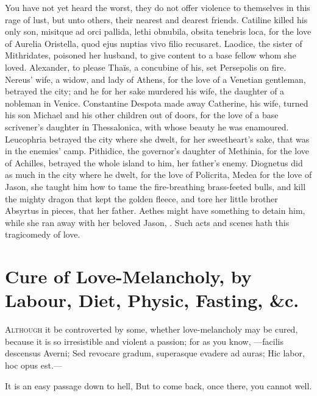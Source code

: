 You have not yet heard the worst, they do not offer violence to
themselves in this rage of lust, but unto others, their nearest and
dearest friends. Catiline killed his only son, misitque ad orci
pallida, lethi obnubila, obsita tenebris loca, for the love of Aurelia
Oristella, quod ejus nuptias vivo filio recusaret. Laodice, the
sister of Mithridates, poisoned her husband, to give content to a base
fellow whom she loved. Alexander, to please Thaïs, a concubine of
his, set Persepolis on fire. Nereus' wife, a widow, and lady of
Athens, for the love of a Venetian gentleman, betrayed the city; and he
for her sake murdered his wife, the daughter of a nobleman in Venice.
Constantine Despota made away Catherine, his wife, turned his son
Michael and his other children out of doors, for the love of a base
scrivener's daughter in Thessalonica, with whose beauty he was
enamoured. Leucophria betrayed the city where she dwelt, for her
sweetheart's sake, that was in the enemies' camp. Pithidice, the
governor's daughter of Methinia, for the love of Achilles, betrayed the
whole island to him, her father's enemy. Diognetus did as much in
the city where he dwelt, for the love of Policrita, Medea for the love
of Jason, she taught him how to tame the fire-breathing brass-feeted
bulls, and kill the mighty dragon that kept the golden fleece, and tore
her little brother Absyrtus in pieces, that her father. Aethes might
have something to detain him, while she ran away with her beloved
Jason, \etc{}. Such acts and scenes hath this tragicomedy of love.


\section[Cure of Love-Melancholy]{Cure of Love-Melancholy, by Labour, Diet, Physic, Fasting, \&c.}

\lettrine{A}{lthough} it be controverted by some, whether love-melancholy may be
cured, because it is so irresistible and violent a passion; for as you
know,
---facilis descensus Averni;
Sed revocare gradum, superasque evadere ad auras;
Hic labor, hoc opus est.---

It is an easy passage down to hell,
But to come back, once there, you cannot well.

